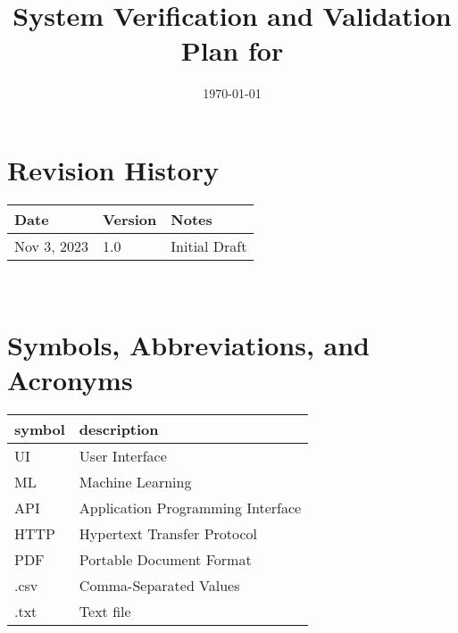 \documentclass[12pt, titlepage]{article}
\begin{document}
\title{System Verification and Validation Plan for \progname{}} 
\author{\authname}
\date{\today}
	
\maketitle


\section*{Revision History}

\begin{tabularx}{\textwidth}{p{3cm}p{2cm}X}
\toprule {\bf Date} & {\bf Version} & {\bf Notes}\\
\midrule
Nov 3, 2023 & 1.0 & Initial Draft\\
\bottomrule
\end{tabularx}

~\\

\newpage

\tableofcontents

\listoftables


\newpage

\section{Symbols, Abbreviations, and Acronyms}

\renewcommand{\arraystretch}{1.2}
\begin{tabular}{l l} 
  \toprule		
  \textbf{symbol} & \textbf{description}\\
  \midrule 
      UI & User Interface \\
      ML & Machine Learning\\
      API & Application Programming Interface\\
      HTTP & Hypertext Transfer Protocol\\
      PDF & Portable Document Format\\
      .csv & Comma-Separated Values \\
      .txt & Text file\\
  \bottomrule
  
\end{tabular}\\


\newpage

\end{document}
